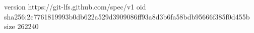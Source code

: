 version https://git-lfs.github.com/spec/v1
oid sha256:2c7761819993b0db622a529d3909086ff93a8d3b6fa58bdb95666f385f0d455b
size 262240
